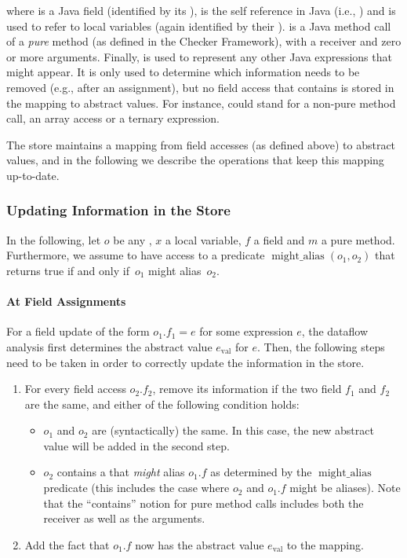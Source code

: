 \begin{new}
where  is a Java field (identified by its ),
 is the self reference in Java (i.e., )
and  is used to refer to local variables (again
identified by their ).
 is a Java method call of a \textit{pure} method
(as defined in the Checker Framework), with a receiver and zero or more
arguments.  Finally,  is used to represent any other
Java expressions that might appear.  It is only used to determine which
information needs to be removed (e.g., after an assignment), but no field
access that contains  is stored in the mapping to
abstract values.  For instance,  could stand for
a non-pure method call, an array access or a ternary expression.

The store maintains a mapping from field accesses (as defined above) to
abstract values, and in the following we describe the operations that
keep this mapping up-to-date.

\subsubsection{Updating Information in the Store}

\newcommand{\alias}{\operatorname{might\_alias}}

In the following, let $o$ be any ,
$x$ a local variable, $f$ a
field and $m$ a pure method.  Furthermore, we assume to have access to
a predicate $\alias(o_1,o_2)$ that returns true if and only
if~$o_1$ might alias~$o_2$.

\paragraph{At Field Assignments}
For a field update of the form $o_1.f_1 = e$ for some expression $e$, the
dataflow analysis first determines the abstract value $e_\text{val}$ for $e$.
Then, the following steps need to be taken in order to correctly update
the information in the store.
\begin{enumerate}
    \item For every field access $o_2.f_2$, remove its information if
    the two field $f_1$ and $f_2$ are the same, and either of the following
    condition holds:
    \begin{itemize}
        \item $o_1$ and $o_2$ are (syntactically) the same.  In this case, the
        new abstract value will be added in the second step.
        \item $o_2$ contains a  that \emph{might}
        alias $o_1.f$ as determined by the $\alias$
        predicate (this includes the case where $o_2$ and $o_1.f$ might be
        aliases).  Note that the ``contains'' notion for pure method calls
        includes both the receiver as well as the arguments.
    \end{itemize}
    \item Add the fact that $o_1.f$ now has the abstract value $e_\text{val}$
    to the mapping.
\end{enumerate}



\end{new}
